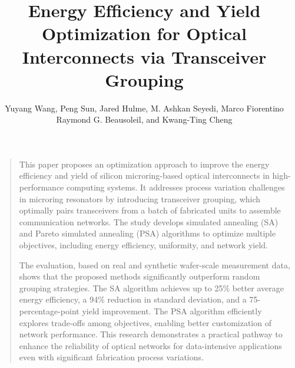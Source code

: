 



\usepackage{pdfpages} %

\pretitle{\begin{center}\LARGE}
\posttitle{\end{center}\vspace{-1.0em}}
\predate{}
\postdate{}

\title{Energy Efﬁciency and Yield Optimization for Optical Interconnects via Transceiver Grouping}
\author{Yuyang Wang, Peng Sun, Jared Hulme, M. Ashkan Seyedi, Marco Fiorentino\\Raymond G. Beausoleil, and Kwang-Ting Cheng}
\date{}

\fancyfoot[L]{\scshape \MakeLowercase{\myName{}}}




\maketitle%
\thispagestyle{fancy}

\begin{quote}
    \large
    This paper proposes an optimization approach to improve the energy efficiency and yield of silicon microring-based optical interconnects in high-performance computing systems. It addresses process variation challenges in microring resonators by introducing transceiver grouping, which optimally pairs transceivers from a batch of fabricated units to assemble communication networks. The study develops simulated annealing (SA) and Pareto simulated annealing (PSA) algorithms to optimize multiple objectives, including energy efficiency, uniformity, and network yield.

    The evaluation, based on real and synthetic wafer-scale measurement data, shows that the proposed methods significantly outperform random grouping strategies. The SA algorithm achieves up to 25\% better average energy efficiency, a 94\% reduction in standard deviation, and a 75-percentage-point yield improvement. The PSA algorithm efficiently explores trade-offs among objectives, enabling better customization of network performance. This research demonstrates a practical pathway to enhance the reliability of optical networks for data-intensive applications even with significant fabrication process variations.
\end{quote}



